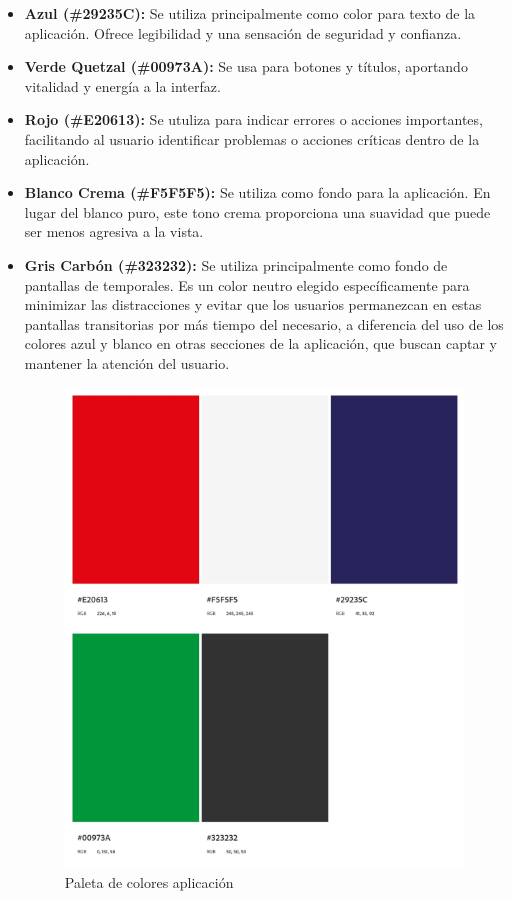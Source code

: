 \begin{itemize}
    \item \textbf{Azul (\#29235C):} Se utiliza principalmente como color para texto de la aplicación. Ofrece legibilidad y una sensación de seguridad y confianza.  
    
    \item \textbf{Verde Quetzal (\#00973A):} Se usa para botones y títulos, aportando vitalidad y energía a la interfaz. 
       
    \item \textbf{Rojo (\#E20613):} Se utuliza para indicar errores o acciones importantes, facilitando al usuario identificar problemas o acciones críticas dentro de la aplicación.

    \item \textbf{Blanco Crema (\#F5F5F5):} Se utiliza como fondo para la aplicación. En lugar del blanco puro, este tono crema proporciona una suavidad que puede ser menos agresiva a la vista. 
    
    \item \textbf{Gris Carbón (\#323232):} Se utiliza principalmente como fondo de pantallas de temporales. Es un color neutro elegido específicamente para minimizar las distracciones y evitar que los usuarios permanezcan en estas pantallas transitorias por más tiempo del necesario, a diferencia del uso de los colores azul y blanco en otras secciones de la aplicación, que buscan captar y mantener la atención del usuario.

\begin{figure} [H]
    \centering
    \includegraphics[width=0.6\linewidth]{figuras/paleta_colores.png}
    \caption{Paleta de colores aplicación}
    \label{fig:enter-label}
\end{figure}

    
    
\end{itemize}

